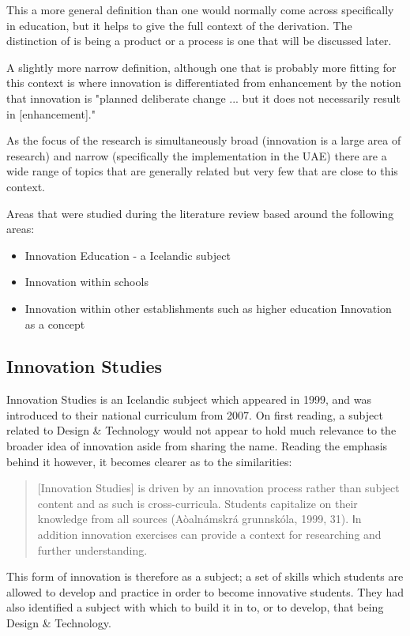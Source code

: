 This a more general definition than one would normally come across specifically in education, but it helps to give the full context of the derivation. The distinction of is being a product or a process \cite{} is one that will be discussed later.

A slightly more narrow definition, although one that is probably more fitting for this context is where innovation is differentiated from enhancement by the notion that innovation is "planned deliberate change ... but it does not necessarily result in [enhancement]." \cite{hannan2002innovative}

As the focus of the research is simultaneously broad (innovation is a large area of research) and narrow (specifically the implementation in the UAE) there are a wide range of topics that are generally related but very few that are close to this context. 

Areas that were studied during the literature review based around the following areas:
\begin{itemize}
\item Innovation Education - a Icelandic subject
\item Innovation within schools
\item Innovation within other establishments such as higher education
\ite Innovation as a concept
\end{itemize}

\subsection{Innovation Studies}
Innovation Studies is an Icelandic subject which appeared in 1999, and was introduced to their national curriculum from 2007. On first reading, a subject related to Design & Technology would not appear to hold much relevance to the broader idea of innovation aside from sharing the name. Reading the emphasis behind it however, it becomes clearer as to the similarities:
\begin{quote}
[Innovation Studies] is driven by an innovation process rather than subject content and as such is cross-curricula. Students capitalize on their
knowledge from all sources (Aòalnámskrá grunnskóla, 1999, 31). Ⅰn addition innovation exercises can provide a context for researching and further understanding.
\end{quote} \cite{thorsteinsson2005innovation}

This form of innovation is therefore as a subject; a set of skills which students are allowed to develop and practice in order to become innovative students. They had also identified a subject with which to build it in to, or to develop, that being Design & Technology.

